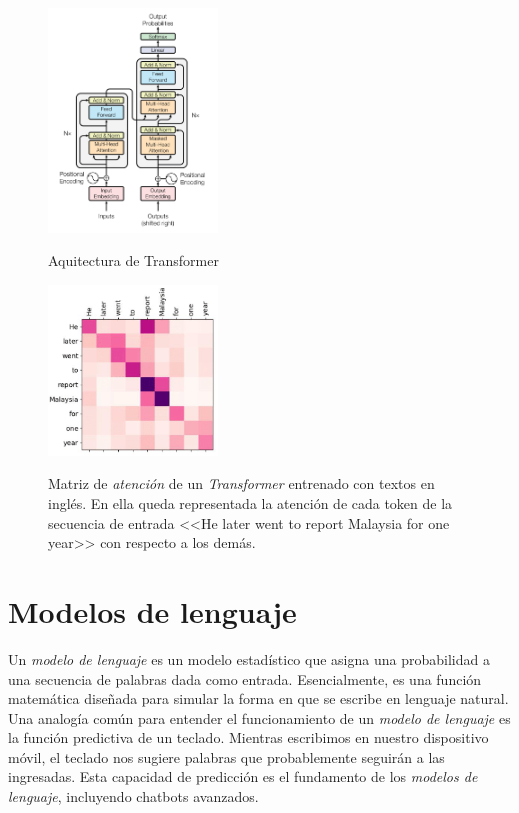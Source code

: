 \begin{figure}[H]
    \caption[Aquitectura de Transformer]{Aquitectura de Transformer}
    \centering
    \includegraphics[width=0.4\textwidth]{./figuras/Transformer_architecture.png}
    \label{fig:transformer_architecture}
\end{figure}

\begin{figure}[H]
    \caption[Matriz de \textit{atención} de un \textit{Transformer} entrenado con textos en inglés]{Matriz de \textit{atención} de un \textit{Transformer} entrenado con textos en inglés. En ella queda representada la atención de cada token de la secuencia de entrada <<He later went to report Malaysia for one year>> con respecto a los demás.}
    \centering
    \includegraphics[width=0.4\textwidth]{./figuras/Transformer_attention_matrix.png}
    \label{fig:transformer_attention}
\end{figure}

\section{Modelos de lenguaje}

Un \textit{modelo de lenguaje} es un modelo estadístico que asigna una probabilidad a una secuencia de palabras dada como entrada. Esencialmente, es una función matemática diseñada para simular la forma en que se escribe en lenguaje natural. Una analogía común para entender el funcionamiento de un \textit{modelo de lenguaje} es la función predictiva de un teclado. Mientras escribimos en nuestro dispositivo móvil, el teclado nos sugiere palabras que probablemente seguirán a las ingresadas. Esta capacidad de predicción es el fundamento de los \textit{modelos de lenguaje}, incluyendo chatbots avanzados.

